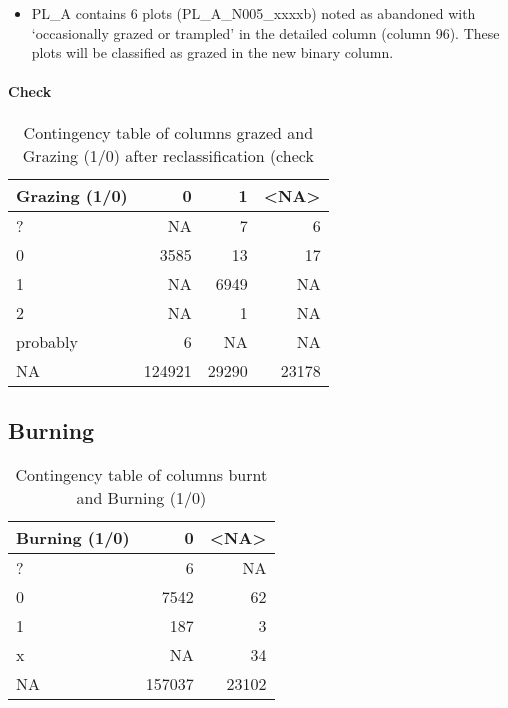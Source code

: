 \documentclass[table]{article}
\newenvironment{Shaded}{\begin{snugshade}}{\end{snugshade}}
\newcommand{\KeywordTok}[1]{\textcolor[rgb]{0.13,0.29,0.53}{\textbf{#1}}}
\newcommand{\DataTypeTok}[1]{\textcolor[rgb]{0.13,0.29,0.53}{#1}}
\newcommand{\DecValTok}[1]{\textcolor[rgb]{0.00,0.00,0.81}{#1}}
\newcommand{\StringTok}[1]{\textcolor[rgb]{0.31,0.60,0.02}{#1}}
\newcommand{\OperatorTok}[1]{\textcolor[rgb]{0.81,0.36,0.00}{\textbf{#1}}}
\newcommand{\NormalTok}[1]{#1}
\providecommand{\tightlist}{%
  \setlength{\itemsep}{0pt}\setlength{\parskip}{0pt}}
\let\oldparagraph\paragraph
\renewcommand{\paragraph}[1]{\oldparagraph{#1}\mbox{}}
\begin{document}
\begin{itemize}
\tightlist
\item
  PL\_A contains 6 plots (PL\_A\_N005\_xxxxb) noted as abandoned with
  `occasionally grazed or trampled' in the detailed column (column 96).
  These plots will be classified as grazed in the new binary column.
\end{itemize}

\begin{Shaded}
\end{Shaded}

\paragraph{Check}\label{check-1}

\begin{table}[H]

\caption{\label{tab:unnamed-chunk-28}Contingency table of columns grazed and Grazing (1/0) after reclassification (check}
\centering
\begin{tabular}[t]{l|r|r|r}
\hline
Grazing (1/0) & 0 & 1 & <NA>\\
\hline
? & NA & 7 & 6\\
\hline
0 & 3585 & 13 & 17\\
\hline
1 & NA & 6949 & NA\\
\hline
2 & NA & 1 & NA\\
\hline
probably & 6 & NA & NA\\
\hline
NA & 124921 & 29290 & 23178\\
\hline
\end{tabular}
\end{table}

\subsection{Burning}\label{burning}

\begin{table}[H]

\caption{\label{tab:unnamed-chunk-29}Contingency table of columns burnt and Burning (1/0)}
\centering
\begin{tabular}[t]{l|r|r}
\hline
Burning (1/0) & 0 & <NA>\\
\hline
? & 6 & NA\\
\hline
0 & 7542 & 62\\
\hline
1 & 187 & 3\\
\hline
x & NA & 34\\
\hline
NA & 157037 & 23102\\
\hline
\end{tabular}
\end{table}
\end{document}
